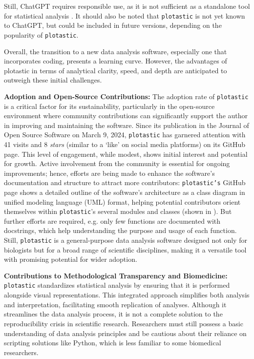 Still, ChatGPT requires responsible use, as it is not sufficient as a standalone
tool for statistical analysis \cite{ordakChatGPTSkillsStatistical2023}. It
should also be noted that \texttt{plotastic} is not yet known to ChatGPT, but
could be included in future versions, depending on the popularity of
\texttt{plotastic}.

Overall, the transition to a new data analysis software, especially one
that incorporates coding, presents a learning curve. However, the advantages of
plotastic in terms of analytical clarity, speed, and depth are anticipated to
outweigh these initial challenges.




\textbf{Adoption and Open-Source Contributions:}
The adoption rate of \texttt{plotastic} is a critical factor for its
sustainability, particularly in the open-source environment where community
contributions can significantly support the author in improving and maintaining
the software. Since its publication in the Journal of Open Source Software on
March 9, 2024, \texttt{plotastic} has garnered attention with 41 visits and 8
\emph{stars} (similar to a `like' on social media platforms) on its GitHub page.
This level of engagement, while modest, shows initial interest and potential for
growth. Active involvement from the community is essential for ongoing
improvements; hence, efforts are being made to enhance the software's
documentation and structure to attract more contributors: \texttt{plotastic's}
GitHub page shows a detailed outline of the software's architecture as a class
diagram in unified modeling language (UML) format, helping potential
contributors orient themselves within \texttt{plotastic}'s several modules and
classes (shown in ). But further efforts are
required, e.g. only few functions are documented with docstrings, which help
understanding the purpose and usage of each function. Still, \texttt{plotastic}
is a general-purpose data analysis software designed not only for biologists but
for a broad range of scientific disciplines, making it a versatile tool with
promising potential for wider adoption.





\textbf{Contributions to Methodological Transparency and Biomedicine:}
\texttt{plotastic} standardizes statistical analysis by ensuring that it is
performed alongside visual representations. This integrated approach simplifies
both analysis and interpretation, facilitating smooth replication of analyses.
Although it streamlines the data analysis process, it is not a complete solution
to the reproducibility crisis in scientific research. Researchers must still
possess a basic understanding of data analysis principles and be cautious about
their reliance on scripting solutions like Python, which is less familiar to
some biomedical researchers. 

